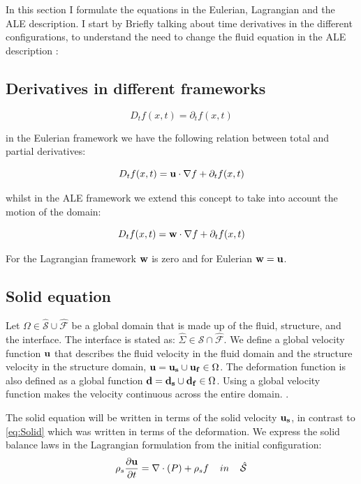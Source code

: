 In this section I formulate the equations in the Eulerian, Lagrangian and the ALE description. I start by Briefly talking about time derivatives in the different configurations, to understand the need to change the fluid equation in the ALE description \cite{Wick2011}:

\subsection{Derivatives in different frameworks}
\begin{equation}
D_t f(x,t) = \partial_t f(x,t) 
\end{equation}

in the Eulerian framework we have the following relation between total and partial derivatives:

\begin{equation}
D_t f(x,t) = \bold{u}\cdot \nabla{f} + \partial_t f(x,t)
\end{equation}

whilst in the ALE framework we extend this concept to take into account the motion of the domain:

\begin{equation}
D_t f(x,t) = \bold{w} \cdot\nabla{f} + \partial_t f(x,t)
\end{equation}

For the Lagrangian framework $ \bold{w}$ is zero and for Eulerian $\bold{w} = \bold{u}$.

\subsection{Solid equation}
Let $\Omega \in \hat{\mathcal{S}} \cup \hat{\mathcal{F}} $ be a global domain that is made up of the fluid, structure, and the interface. The interface is stated as: $ \hat{\Sigma} \in \hat{\mathcal{S}} \cap \hat{\mathcal{F}}  $. We define a global velocity function $\bold{u}$ that describes the fluid velocity in the fluid domain and the structure velocity in the structure domain, $\bold{u} = \bold{u_s} \cup \bold{u_f} \in \Omega$. The deformation function is also defined as a global function $\bold{d} = \bold{d_s} \cup \bold{d_f} \in \Omega$. Using a global velocity function makes the velocity continuous across the entire domain. .\newline 

The solid equation will be written in terms of the solid velocity $\bold{u_s}$, in contrast to \ref{eq:Solid} which was written in terms of the deformation.
We express the solid balance laws in the Lagrangian formulation from the initial configuration:
\begin{equation} \label{eq:solid}
\rho_s \frac{\partial \bold{u}}{\partial t} = \nabla \cdot (P) + \rho_s f \hspace{4mm}in\hspace{4mm} \hat{\mathcal{S}} 
\end{equation}
